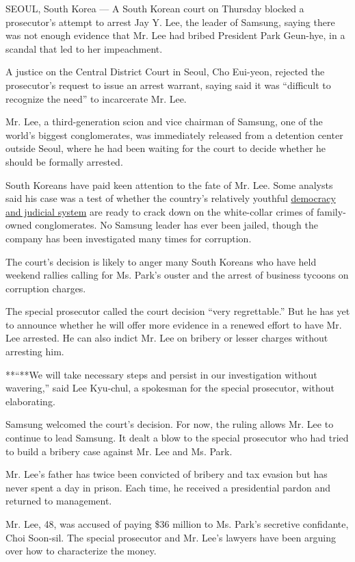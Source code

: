 SEOUL, South Korea --- A South Korean court on Thursday blocked a
prosecutor's attempt to arrest Jay Y. Lee, the leader of Samsung, saying
there was not enough evidence that Mr. Lee had bribed President Park
Geun-hye, in a scandal that led to her impeachment.

A justice on the Central District Court in Seoul, Cho Eui-yeon, rejected
the prosecutor's request to issue an arrest warrant, saying said it was
``difficult to recognize the need'' to incarcerate Mr. Lee.

Mr. Lee, a third-generation scion and vice chairman of Samsung, one of
the world's biggest conglomerates, was immediately released from a
detention center outside Seoul, where he had been waiting for the court
to decide whether he should be formally arrested.

South Koreans have paid keen attention to the fate of Mr. Lee. Some
analysts said his case was a test of whether the country's relatively
youthful
\href{https://www.nytimes3xbfgragh.onion/2017/01/02/world/asia/south-korea-park-geun-hye-samsung.html}{democracy
and judicial system} are ready to crack down on the white-collar crimes
of family-owned conglomerates. No Samsung leader has ever been jailed,
though the company has been investigated many times for corruption.

The court's decision is likely to anger many South Koreans who have held
weekend rallies calling for Ms. Park's ouster and the arrest of business
tycoons on corruption charges.

The special prosecutor called the court decision ``very regrettable.''
But he has yet to announce whether he will offer more evidence in a
renewed effort to have Mr. Lee arrested. He can also indict Mr. Lee on
bribery or lesser charges without arresting him.

**``**We will take necessary steps and persist in our investigation
without wavering,'' said Lee Kyu-chul, a spokesman for the special
prosecutor, without elaborating.

Samsung welcomed the court's decision. For now, the ruling allows Mr.
Lee to continue to lead Samsung. It dealt a blow to the special
prosecutor who had tried to build a bribery case against Mr. Lee and Ms.
Park.

Mr. Lee's father has twice been convicted of bribery and tax evasion but
has never spent a day in prison. Each time, he received a presidential
pardon and returned to management.

Mr. Lee, 48, was accused of paying \$36 million to Ms. Park's secretive
confidante, Choi Soon-sil. The special prosecutor and Mr. Lee's lawyers
have been arguing over how to characterize the money.

